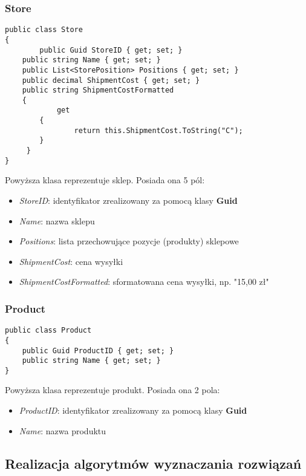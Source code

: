 \documentclass[a4paper]{article}
\begin{document}
\subsubsection{Store}
\lstset{style=sharpc}
\begin{lstlisting}
public class Store
{           
		public Guid StoreID { get; set; }
    public string Name { get; set; }
    public List<StorePosition> Positions { get; set; }
    public decimal ShipmentCost { get; set; }
    public string ShipmentCostFormatted
    {
    		get
        {
        		return this.ShipmentCost.ToString("C");
        }
     }
}
\end{lstlisting}
\begin{flushleft}
Powyższa klasa reprezentuje sklep. Posiada ona 5 pól: 
\begin{itemize}
\item \textit{StoreID}: identyfikator zrealizowany za pomocą klasy \textbf{Guid} 
\item \textit{Name}: nazwa sklepu
\item \textit{Positions}: lista przechowujące pozycje (produkty) sklepowe
\item \textit{ShipmentCost}: cena wysyłki
\item \textit{ShipmentCostFormatted}: sformatowana cena wysyłki, np. "15,00 zł"
\end{itemize}
\end{flushleft}
\subsubsection{Product}
\lstset{style=sharpc}
\begin{lstlisting}
public class Product
{     
	public Guid ProductID { get; set; }      
	public string Name { get; set; }        
}
\end{lstlisting}
\begin{flushleft}
Powyższa klasa reprezentuje produkt. Posiada ona 2 pola: 
\begin{itemize}
\item \textit{ProductID}: identyfikator zrealizowany za pomocą klasy \textbf{Guid} 
\item \textit{Name}: nazwa produktu
\end{itemize}
\end{flushleft}
\subsection{Realizacja algorytmów wyznaczania rozwiązań}
\end{document}
